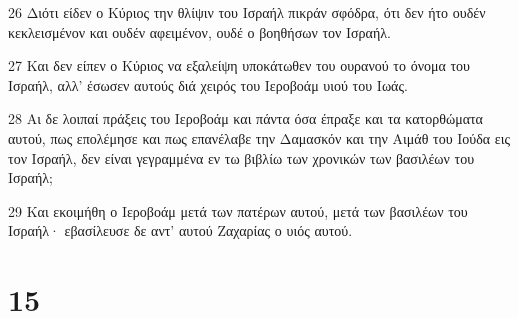 \par 26 Διότι είδεν ο Κύριος την θλίψιν του Ισραήλ πικράν σφόδρα, ότι δεν ήτο ουδέν κεκλεισμένον και ουδέν αφειμένον, ουδέ ο βοηθήσων τον Ισραήλ.
\par 27 Και δεν είπεν ο Κύριος να εξαλείψη υποκάτωθεν του ουρανού το όνομα του Ισραήλ, αλλ' έσωσεν αυτούς διά χειρός του Ιεροβοάμ υιού του Ιωάς.
\par 28 Αι δε λοιπαί πράξεις του Ιεροβοάμ και πάντα όσα έπραξε και τα κατορθώματα αυτού, πως επολέμησε και πως επανέλαβε την Δαμασκόν και την Αιμάθ του Ιούδα εις τον Ισραήλ, δεν είναι γεγραμμένα εν τω βιβλίω των χρονικών των βασιλέων του Ισραήλ;
\par 29 Και εκοιμήθη ο Ιεροβοάμ μετά των πατέρων αυτού, μετά των βασιλέων του Ισραήλ· εβασίλευσε δε αντ' αυτού Ζαχαρίας ο υιός αυτού.

\chapter{15}


